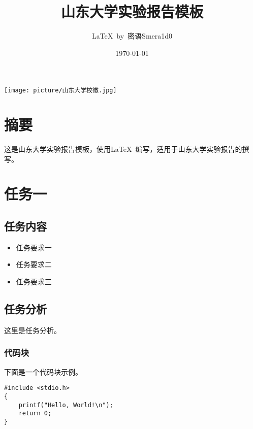\documentclass[UTF8]{ctexart}
\title{山东大学实验报告模板}
\author{\LaTeX\ by\ 密语Smera1d0}
\date{\today}
\begin{document}
\fancyhf{}
\fancyfoot[C]{\thepage}

\begin{titlingpage} %
    \centering
    \texttt{[image: picture/山东大学校徽.jpg]}

    \vspace{1cm} %

    {\Huge \thetitle\par} %
    \vspace{1cm}
    {\Large \theauthor\par} %
    \vfill
    {\large \thedate\par} %
\end{titlingpage}

\newpage
\vspace*{\fill} %
\tableofcontents %
\vspace*{\fill} %

\newpage
\section{摘要}
这是山东大学实验报告模板，使用\LaTeX\ 编写，适用于山东大学实验报告的撰写。

\section{任务一}
\subsection{任务内容}
\begin{itemize}
    \item 任务要求一
    \item 任务要求二
    \item 任务要求三
\end{itemize}

\subsection{任务分析}
这里是任务分析。
\subsubsection{代码块}
下面是一个代码块示例。
\begin{lstlisting}
#include <stdio.h>
{
    printf("Hello, World!\n");
    return 0;
}
\end{lstlisting}
\end{document}

